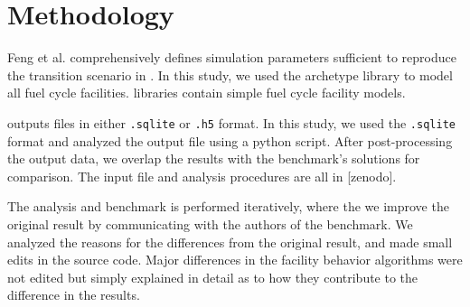 \section{Methodology}

Feng et al. comprehensively defines simulation parameters
sufficient to reproduce the transition scenario in \Cyclus.
In this study, we used the \Cycamore \cite{huff_fundamental_2016}
 archetype library to model
all fuel cycle facilities. \Cycamore libraries contain
simple fuel cycle facility models. 

\Cyclus outputs files in either \texttt{.sqlite} or
\texttt{.h5} format. In this study, we used the
\texttt{.sqlite} format and analyzed the output file
using a python script. After post-processing the
output data, we overlap the results with the
benchmark's solutions for comparison. The input file
and analysis procedures are all in [zenodo].

The analysis and benchmark is performed iteratively,
where the we improve the original result by communicating
with the authors of the benchmark. 
We analyzed the reasons for the differences from the original
result, and made small edits in the source code.
Major differences in the facility behavior algorithms were not edited but
simply explained in detail as to how they contribute
to the difference in the results.
